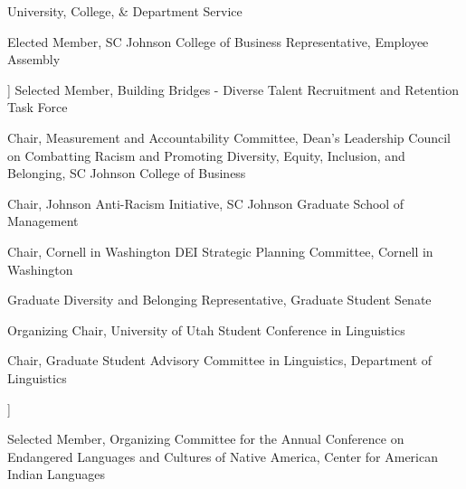 \begin{rubric}{University, College, \& Department Service}


    
    \entry*[2022-2023][\faVoteYea]%
        Elected Member, SC Johnson College of Business Representative, Employee Assembly
    
    \entry*[2020-2021][\faUsers[regular]]%
        Selected Member, Building Bridges - Diverse Talent Recruitment and Retention Task Force
    
    
    \entry*[2021-2023][\faBullhorn]%
        Chair, Measurement and Accountability Committee, Dean's Leadership Council on Combatting Racism and Promoting Diversity, Equity, Inclusion, and Belonging, SC Johnson College of Business
        
    \entry*[2022-2023][\faBullhorn]
    Chair, Johnson Anti-Racism Initiative, SC Johnson Graduate School of Management
    
    
    \entry*[2020-2021][\faBullhorn]
    Chair, Cornell in Washington DEI Strategic Planning Committee, Cornell in Washington
    
    
    
    
    \entry*[2020-2021][\faVoteYea]
    Graduate Diversity and Belonging Representative, Graduate Student Senate
    
    
    
    
    
    \entry*[2012][\faBullhorn]
    Organizing Chair, University of Utah Student Conference in Linguistics
    
    
    \entry*[2011-2012][\faBullhorn]
    Chair, Graduate Student Advisory Committee in Linguistics, Department of Linguistics
    
    \entry*[2011-2012][\faUsers[regular]]
    
    Selected Member, Organizing Committee for the Annual Conference on Endangered Languages and Cultures of Native America, Center for American Indian Languages
    
    
    
    
    \end{rubric}
